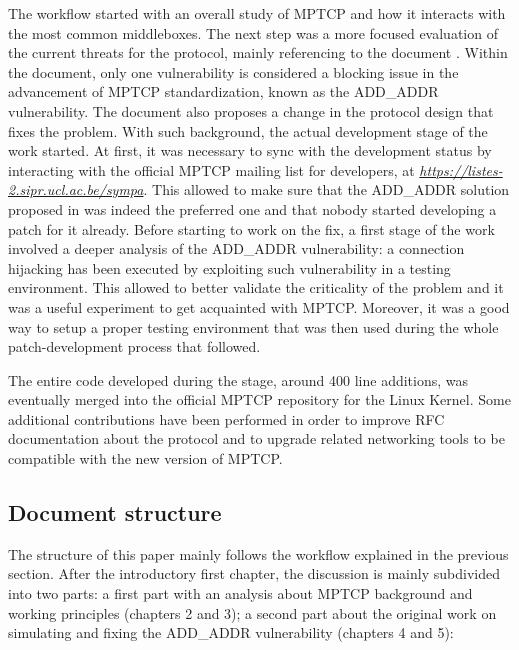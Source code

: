 The workflow started with an overall study of MPTCP and how it interacts with the most common middleboxes. The next step was a more focused evaluation of the current threats for the protocol, mainly referencing to the document . Within the document, only one vulnerability is considered a blocking issue in the advancement of MPTCP standardization, known as the ADD\_ADDR vulnerability. The document also proposes a change in the protocol design that fixes the problem. With such background, the actual development stage of the work started. At first, it was necessary to sync with the development status by interacting with the official MPTCP mailing list for developers, at \href{https://listes-2.sipr.ucl.ac.be/sympa}{\textit{https://listes-2.sipr.ucl.ac.be/sympa}}. This allowed to make sure that the ADD\_ADDR solution proposed in  was indeed the preferred one and that nobody started developing a patch for it already.
Before starting to work on the fix, a first stage of the work involved a deeper analysis of the ADD\_ADDR vulnerability: a connection hijacking has been executed by exploiting such vulnerability in a testing environment. This allowed to better validate the criticality of the problem and it was a useful experiment to get acquainted with MPTCP. Moreover, it was a good way to setup a proper testing environment that was then used during the whole patch-development process that followed.

The entire code developed during the stage, around 400 line additions, was eventually merged into the official MPTCP repository for the Linux Kernel. Some additional contributions have been performed in order to improve RFC documentation about the protocol and to upgrade related networking tools to be compatible with the new version of MPTCP.

\subsection{Document structure}
The structure of this paper mainly follows the workflow explained in the previous section. After the introductory first chapter, the discussion is mainly subdivided into two parts: a first part with an analysis about MPTCP background and working principles (chapters 2 and 3); a second part about the original work on simulating and fixing the ADD\_ADDR vulnerability (chapters 4 and 5):

